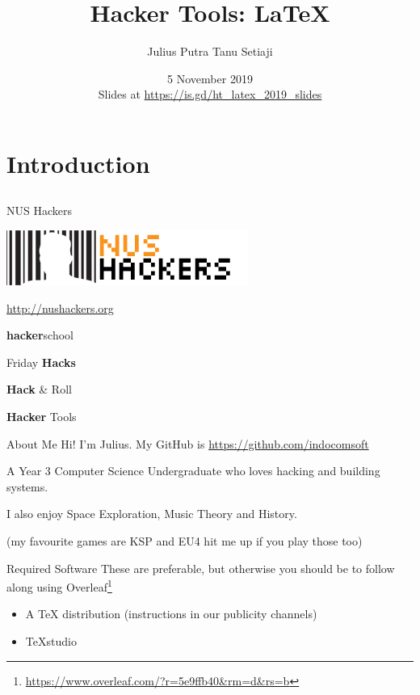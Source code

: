 \documentclass[12pt]{beamer}
\title{Hacker Tools: \LaTeX{}}
\author{Julius Putra Tanu Setiaji}
\date{5 November 2019 \\ Slides at \url{https://is.gd/ht_latex_2019_slides}}
\begin{document}
\frame[plain]{\titlepage}

\section{Introduction}
\subsection{}

\begin{frame}{NUS Hackers}

  \begin{center}
    \includegraphics[width=0.5\linewidth]{../NUSHackers}

    \url{http://nushackers.org}
  \end{center}

  \begin{center}
    \textbf{hacker}school

    Friday \textbf{Hacks}

    \textbf{Hack} \& Roll

    \textbf{Hacker} Tools
  \end{center}

\end{frame}

\begin{frame}{About Me}
  Hi! I'm Julius. My GitHub is \url{https://github.com/indocomsoft}

  A Year 3 Computer Science Undergraduate who loves hacking and building systems.

  I also enjoy Space Exploration, Music Theory and History.

    {\tiny (my favourite games are KSP and EU4 hit me up if you play those too)}
\end{frame}

\begin{frame}{Required Software}
  These are preferable, but otherwise you should be to follow along using Overleaf\footnote{\url{https://www.overleaf.com/?r=5e9ffb40&rm=d&rs=b}}
  \begin{itemize}
    \item A \TeX{} distribution (instructions in our publicity channels)
    \item TeXstudio
  \end{itemize}
\end{frame}
\end{document}

